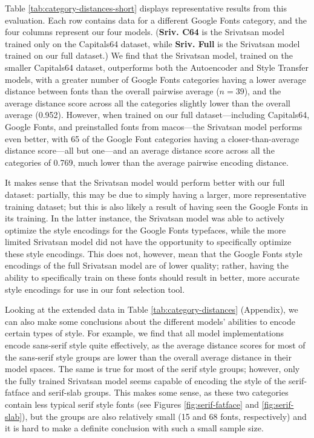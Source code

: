 Table \ref{tab:category-distances-short} displays representative results from this evaluation. Each row contains data for a different Google Fonts category, and the four columns represent our four models. (\textbf{Sriv. C64} is the Srivatsan model trained only on the Capitals64 dataset, while \textbf{Sriv. Full} is the Srivatsan model trained on our full dataset.) We find that the Srivatsan model, trained on the smaller Capitals64 dataset, outperforms both the Autoencoder and Style Transfer models, with a greater number of Google Fonts categories having a lower average distance between fonts than the overall pairwise average ($n=39$), and the average distance score across all the categories slightly lower than the overall average (0.952). However, when trained on our full dataset---including Capitals64, Google Fonts, and preinstalled fonts from macos---the Srivatsan model performs even better, with 65 of the Google Font categories having a closer-than-average distance score---all but one---and an average distance score across all the categories of 0.769, much lower than the average pairwise encoding distance.

It makes sense that the Srivatsan model would perform better with our full dataset: partially, this may be due to simply having a larger, more representative training dataset; but this is also likely a result of having seen the Google Fonts in its training. In the latter instance, the Srivatsan model was able to actively optimize the style encodings for the Google Fonts typefaces, while the more limited Srivatsan model did not have the opportunity to specifically optimize these style encodings. This does not, however, mean that the Google Fonts style encodings of the full Srivatsan model are of lower quality; rather, having the ability to specifically train on these fonts should result in better, more accurate style encodings for use in our font selection tool.

Looking at the extended data in Table \ref{tab:category-distances} (Appendix), we can also make some conclusions about the different models' abilities to encode certain types of style. For example, we find that all model implementations encode sans-serif style quite effectively, as the average distance scores for most of the sans-serif style groups are lower than the overall average distance in their model spaces. The same is true for most of the serif style groups; however, only the fully trained Srivatsan model seems capable of encoding the style of the serif-fatface and serif-slab groups. This makes some sense, as these two categories contain less typical serif style fonts (see Figures \ref{fig:serif-fatface} and \ref{fig:serif-slab}), but the groups are also relatively small (15 and 68 fonts, respectively) and it is hard to make a definite conclusion with such a small sample size.

